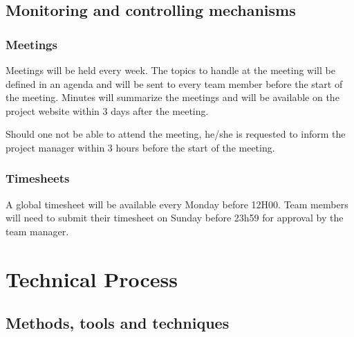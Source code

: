 \documentclass[a4paper, 12pt]{report}
\begin{document}
			

		\section{Monitoring and controlling mechanisms}	
			
			\subsection{Meetings}
			Meetings will be held every week. The topics to handle at the meeting will be defined
			in an agenda and will be sent to every team member before the start of the
			meeting. Minutes will summarize the meetings and will be available on the project 
			website within 3 days after the meeting.
			
			Should one not be able to attend the meeting, he/she is requested to inform
			the project manager within 3 hours before the start of the meeting.
			
			\subsection{Timesheets}
			A global timesheet will be available every Monday before 12H00. Team 
			members will need to submit their timesheet on Sunday before 23h59
			for approval by the team manager.
			
	\chapter{Technical Process}
	
			\section{Methods, tools and techniques}
			
\end{document}
